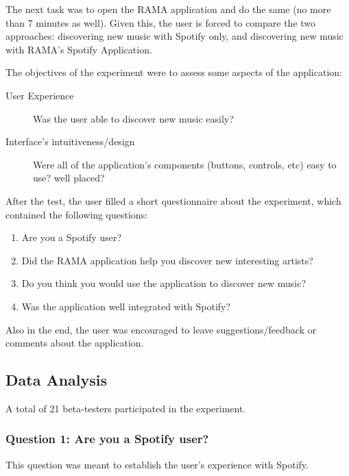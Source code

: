     The next task was to open the RAMA application and do the same (no more than 7 minutes as well).
    Given this, the user is forced to compare the two approaches: discovering new music with Spotify only, and discovering new music with RAMA's Spotify Application.

    The objectives of the experiment were to assess some aspects of the application:

    \begin{description}
      \item[User Experience]
        Was the user able to discover new music easily?
      \item[Interface's intuitiveness/design]
        Were all of the application's components (buttons, controls, etc) easy to use? well placed?
    \end{description}

    After the test, the user filled a short questionnaire about the experiment, which contained the following questions:

    \begin{enumerate}
      \item Are you a Spotify user?
      \item Did the RAMA application help you discover new interesting artists?
      \item Do you think you would use the application to discover new music?
      \item Was the application well integrated with Spotify?
    \end{enumerate}

    Also in the end, the user was encouraged to leave suggestions/feedback or comments about the application.



  \subsection{Data Analysis} %
  \label{sub:data_analysis}

    A total of 21 beta-testers participated in the experiment.

    \subsubsection{Question 1: Are you a Spotify user?} %
    \label{ssub:question_1}

      This question was meant to establish the user's experience with Spotify.


